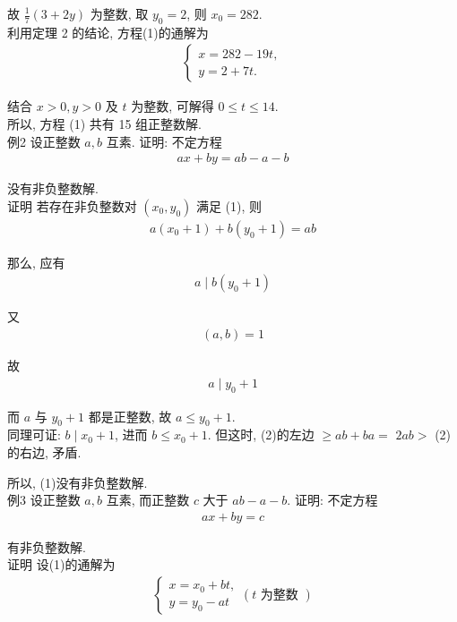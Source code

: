 	故 $\frac{1}{7}(3+2 y)$ 为整数, 取 $y_{0}=2$, 则 $x_{0}=282$.\\
	利用定理 2 的结论, 方程(1)的通解为
\begin{align*}
		\left\{\begin{array}{l}
			       x=282-19 t, \\
			       y=2+7 t .
		       \end{array}\right.
	\end{align*}

	结合 $x>0, y>0$ 及 $t$ 为整数, 可解得 $0 \leqslant t \leqslant 14$.\\
	所以, 方程 (1) 共有 15 组正整数解.\\
	例2 设正整数 $a ,  b$ 互素. 证明: 不定方程
\begin{align*}
		a x+b y=a b-a-b
	\end{align*}

	没有非负整数解.\\
	证明 若存在非负整数对 $\left(x_{0}, y_{0}\right)$ 满足 (1), 则
\begin{align*}
		a\left(x_{0}+1\right)+b\left(y_{0}+1\right)=a b
	\end{align*}

	那么, 应有
\begin{align*}
		a \mid b\left(y_{0}+1\right)
	\end{align*}

	又
\begin{align*}
		(a, b)=1
	\end{align*}

	故
\begin{align*}
		a \mid y_{0}+1
	\end{align*}

	而 $a$ 与 $y_{0}+1$ 都是正整数, 故 $a \leqslant y_{0}+1$.\\
	同理可证: $b \mid x_{0}+1$, 进而 $b \leqslant x_{0}+1$. 但这时, (2)的左边 $\geqslant a b+b a=$ $2 a b>$ (2) 的右边, 矛盾.

	所以, (1)没有非负整数解.\\
	例3 设正整数 $a ,  b$ 互素, 而正整数 $c$ 大于 $a b-a-b$. 证明: 不定方程
\begin{align*}
		a x+b y=c
	\end{align*}

	有非负整数解.\\
	证明 设(1)的通解为
\begin{align*}
		\left\{\begin{array}{l}
			       x=x_{0}+b t, \\
			       y=y_{0}-a t
		       \end{array}(t \text { 为整数 })\right.
	\end{align*}

